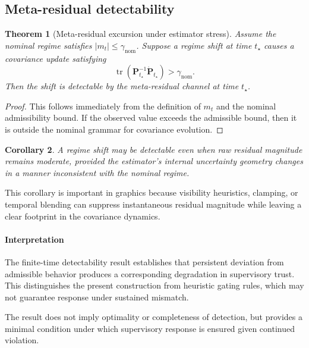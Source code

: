 \documentclass[11pt,letterpaper]{article}
\newcommand{\covar}{\mathbf{P}}
\newcommand{\metares}{m}
\newcommand{\trace}{\operatorname{tr}}
\newcommand{\abs}[1]{\left\lvert #1 \right\rvert}
\theoremstyle{gcresult}
\newtheorem{theorem}{Theorem}[section]
\newtheorem{corollary}[theorem]{Corollary}
\theoremstyle{definition}
\begin{document}
\subsection{Meta-residual detectability}
\begin{theorem}[Meta-residual excursion under estimator stress]
Assume the nominal regime satisfies $\abs{\metares_t} \le \gamma_{\mathrm{nom}}$. Suppose a regime shift at time $t_\star$ causes a covariance update satisfying
\begin{equation}
    \trace(\covar_{t_\star}^{-1}\dot{\covar}_{t_\star}) > \gamma_{\mathrm{nom}}.
\end{equation}
Then the shift is detectable by the meta-residual channel at time $t_\star$.
\end{theorem}

\begin{proof}
This follows immediately from the definition of $\metares_t$ and the nominal admissibility bound. If the observed value exceeds the admissible bound, then it is outside the nominal grammar for covariance evolution.
\end{proof}

\begin{corollary}
A regime shift may be detectable even when raw residual magnitude remains moderate, provided the estimator's internal uncertainty geometry changes in a manner inconsistent with the nominal regime.
\end{corollary}

This corollary is important in graphics because visibility heuristics, clamping, or temporal blending can suppress instantaneous residual magnitude while leaving a clear footprint in the covariance dynamics.

\paragraph{Interpretation}

The finite-time detectability result establishes that persistent deviation from admissible behavior produces a corresponding degradation in supervisory trust. This distinguishes the present construction from heuristic gating rules, which may not guarantee response under sustained mismatch.

The result does not imply optimality or completeness of detection, but provides a minimal condition under which supervisory response is ensured given continued violation.


\end{document}
